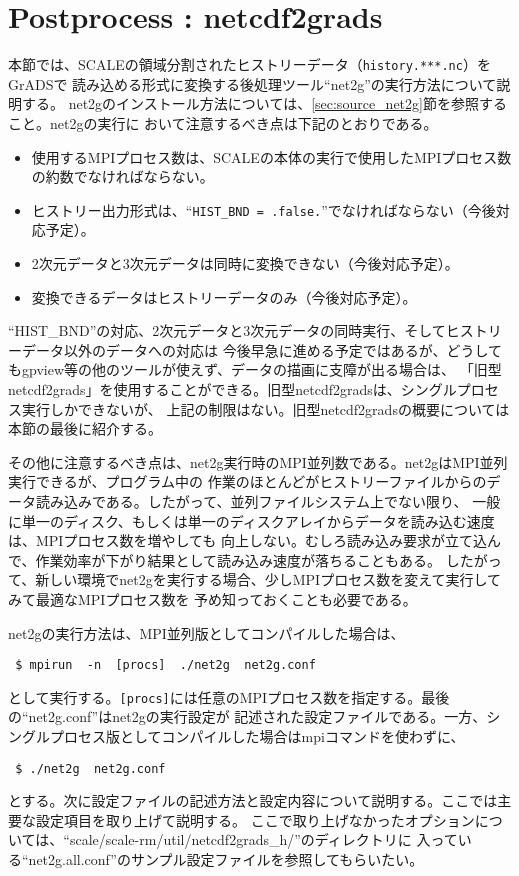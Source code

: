 \section{Postprocess : netcdf2grads}
\label{sec:net2g}

本節では、SCALEの領域分割されたヒストリーデータ（\verb|history.***.nc|）をGrADSで
読み込める形式に変換する後処理ツール``net2g''の実行方法について説明する。
net2gのインストール方法については、\ref{sec:source_net2g}節を参照すること。net2gの実行に
おいて注意するべき点は下記のとおりである。

\begin{itemize}
 \item 使用するMPIプロセス数は、SCALEの本体の実行で使用したMPIプロセス数の約数でなければならない。
 \item ヒストリー出力形式は、``\verb|HIST_BND = .false.|''でなければならない（今後対応予定）。
 \item 2次元データと3次元データは同時に変換できない（今後対応予定）。
 \item 変換できるデータはヒストリーデータのみ（今後対応予定）。
\end{itemize}

``HIST\_BND''の対応、2次元データと3次元データの同時実行、そしてヒストリーデータ以外のデータへの対応は
今後早急に進める予定ではあるが、どうしてもgpview等の他のツールが使えず、データの描画に支障が出る場合は、
「旧型netcdf2grads」を使用することができる。旧型netcdf2gradsは、シングルプロセス実行しかできないが、
上記の制限はない。旧型netcdf2gradsの概要については本節の最後に紹介する。

その他に注意するべき点は、net2g実行時のMPI並列数である。net2gはMPI並列実行できるが、プログラム中の
作業のほとんどがヒストリーファイルからのデータ読み込みである。したがって、並列ファイルシステム上でない限り、
一般に単一のディスク、もしくは単一のディスクアレイからデータを読み込む速度は、MPIプロセス数を増やしても
向上しない。むしろ読み込み要求が立て込んで、作業効率が下がり結果として読み込み速度が落ちることもある。
したがって、新しい環境でnet2gを実行する場合、少しMPIプロセス数を変えて実行してみて最適なMPIプロセス数を
予め知っておくことも必要である。

net2gの実行方法は、MPI並列版としてコンパイルした場合は、
\begin{verbatim}
 $ mpirun  -n  [procs]  ./net2g  net2g.conf
\end{verbatim}
として実行する。\verb|[procs]|には任意のMPIプロセス数を指定する。最後の``net2g.conf''はnet2gの実行設定が
記述された設定ファイルである。一方、シングルプロセス版としてコンパイルした場合はmpiコマンドを使わずに、
\begin{verbatim}
 $ ./net2g  net2g.conf
\end{verbatim}
とする。次に設定ファイルの記述方法と設定内容について説明する。ここでは主要な設定項目を取り上げて説明する。
ここで取り上げなかったオプションについては、``scale/scale-rm/util/netcdf2grads\_h/''のディレクトリに
入っている``net2g.all.conf''のサンプル設定ファイルを参照してもらいたい。

